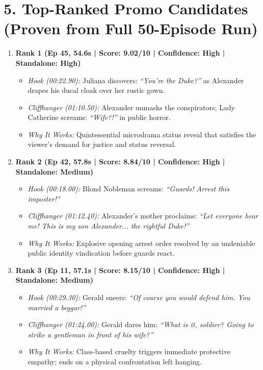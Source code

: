 \documentclass[10pt,a4paper]{article}
\begin{document}
\section*{5. Top-Ranked Promo Candidates (Proven from Full 50-Episode Run)}
\begin{enumerate}[leftmargin=1.2em]
    \item \textbf{Rank 1 (Ep 45, 54.6s | Score: 9.02/10 | Confidence: High | Standalone: High)}
    \begin{itemize}
        \item \textit{Hook (00:22.90):} Juliana discovers: \textit{``You're the Duke?''} as Alexander drapes his ducal cloak over her rustic gown.
        \item \textit{Cliffhanger (01:10.50):} Alexander unmasks the conspirators; Lady Catherine screams: \textit{``Wife?!''} in public horror.
        \item \textit{Why It Works:} Quintessential microdrama status reveal that satisfies the viewer's demand for justice and status reversal.
    \end{itemize}
    \item \textbf{Rank 2 (Ep 42, 57.8s | Score: 8.84/10 | Confidence: High | Standalone: Medium)}
    \begin{itemize}
        \item \textit{Hook (00:18.00):} Blond Nobleman screams: \textit{``Guards! Arrest this imposter!''}
        \item \textit{Cliffhanger (01:12.40):} Alexander's mother proclaims: \textit{``Let everyone hear me! This is my son Alexander... the rightful Duke!''}
        \item \textit{Why It Works:} Explosive opening arrest order resolved by an undeniable public identity vindication before guards react.
    \end{itemize}
    \item \textbf{Rank 3 (Ep 11, 57.1s | Score: 8.15/10 | Confidence: High | Standalone: Medium)}
    \begin{itemize}
        \item \textit{Hook (00:29.30):} Gerald sneers: \textit{``Of course you would defend him. You married a beggar!''}
        \item \textit{Cliffhanger (01:24.00):} Gerald dares him: \textit{``What is it, soldier? Going to strike a gentleman in front of his wife?''}
        \item \textit{Why It Works:} Class-based cruelty triggers immediate protective empathy; ends on a physical confrontation left hanging.

\end{itemize}
\end{enumerate}
\end{document}
